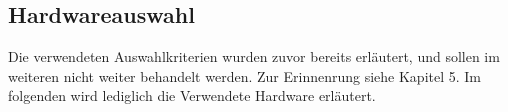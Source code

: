 \subsection{Hardwareauswahl} \label{hardwareauswahl-subsec}

Die verwendeten Auswahlkriterien wurden zuvor bereits erläutert, und sollen im weiteren nicht weiter behandelt werden. Zur Erinnenrung siehe Kapitel 5. Im folgenden wird lediglich die Verwendete Hardware erläutert.


%



